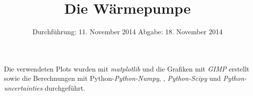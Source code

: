 
\subject{Anfängerpraktikum V206}
\title{Die Wärmepumpe}
\date{
  Durchführung: 11. November 2014
  \hspace{1em}
  Abgabe: 18. November 2014
}


\maketitle
\thispagestyle{empty}
\newpage





\printbibliography
\noindent Die verwendeten Plots wurden mit \textit{matplotlib}\cite{matplotlib} und die Grafiken mit \textit{GIMP}\cite{gimp} erstellt sowie die Berechnungen mit Python-\textit{Python-Numpy}, \cite{numpy}, \textit{Python-Scipy}\cite{scipy} und \textit{Python-uncertainties}\cite{uncertainties} durchgeführt.

